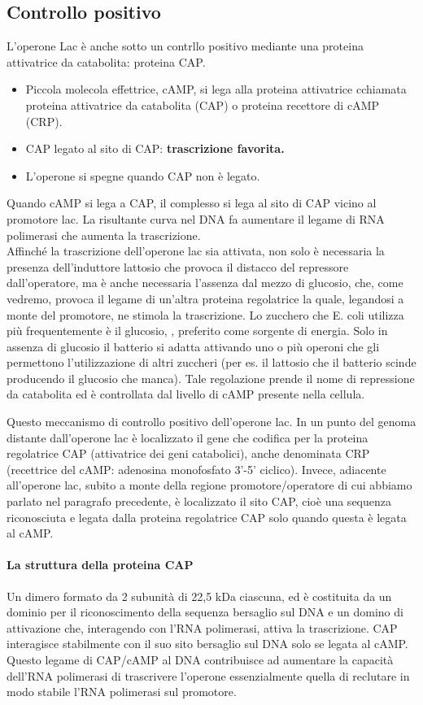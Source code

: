 \documentclass{article}
\begin{document}
\subsection{Controllo positivo}
L'operone Lac è anche sotto un contrllo positivo mediante una proteina attivatrice da catabolita:
proteina CAP.\\
\begin{itemize}
    \item Piccola molecola effettrice, cAMP, si lega alla proteina attivatrice cchiamata proteina attivatrice da catabolita (CAP) o proteina recettore di cAMP (CRP).
    \item CAP legato al sito di CAP: \textbf{trascrizione favorita.}
    \item L'operone si spegne quando CAP non è legato.
\end{itemize}
Quando cAMP si lega a CAP, il complesso si lega al sito di CAP vicino al promotore lac.
La risultante curva nel DNA fa aumentare il legame di RNA polimerasi che aumenta la trascrizione.\\
Affinché la trascrizione dell'operone lac sia attivata, non solo è necessaria la presenza dell'induttore lattosio che 
provoca il distacco del repressore dall'operatore, ma è anche necessaria l'assenza dal 
mezzo di glucosio, che, come vedremo, provoca il legame di un'altra proteina
regolatrice la quale, legandosi a monte del promotore, ne stimola la trascrizione.
Lo zucchero che E. coli utilizza più frequentemente è il glucosio, , preferito come sorgente di energia. Solo in assenza
di glucosio il batterio si adatta attivando uno o più operoni che gli permettono
l'utilizzazione di altri zuccheri (per es. il lattosio che il batterio scinde 
producendo il glucosio che manca). Tale regolazione prende il nome di repressione da
catabolita ed è controllata dal livello di cAMP presente nella cellula.

Questo meccanismo di controllo positivo dell'operone lac. In un punto del genoma distante dall'operone lac è localizzato
il gene che codifica per la proteina regolatrice CAP (attivatrice dei geni catabolici),
anche denominata CRP (recettrice del cAMP: adenosina monofosfato 3'-5' ciclico). Invece, adiacente all'operone lac, subito a monte della regione 
promotore/operatore di cui abbiamo parlato nel paragrafo precedente, è localizzato il sito CAP,
cioè una sequenza riconosciuta e legata dalla proteina regolatrice CAP solo quando questa è legata al cAMP.
\paragraph{La struttura della proteina CAP} Un dimero formato da 2 subunità di 22,5 kDa ciascuna, ed è costituita
da un dominio per il riconoscimento della sequenza bersaglio sul DNA e un domino di attivazione che, interagendo con l'RNA polimerasi, attiva la trascrizione.
CAP interagisce stabilmente con il suo sito
bersaglio sul DNA solo se legata al cAMP. Questo legame di CAP/cAMP al DNA
contribuisce ad aumentare la capacità dell'RNA polimerasi di trascrivere l'operone essenzialmente quella di reclutare in modo stabile l'RNA polimerasi sul promotore.
\end{document}
